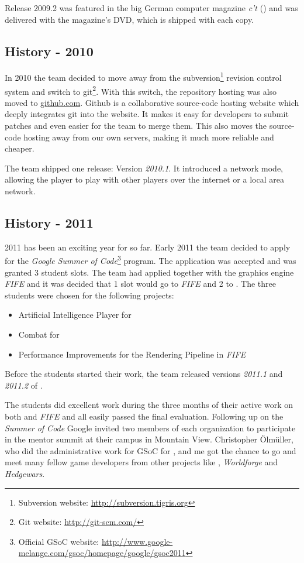 Release 2009.2 was featured in the big German computer magazine \textit{c't} (\cite{ct}) and was delivered with the magazine's
DVD, which is shipped with each copy.

\subsection{History - 2010}
In 2010 the team decided to move away from the subversion\footnote{Subversion website: \url{http://subversion.tigris.org}} revision control
system and switch to git\footnote{Git website: \url{http://git-scm.com/}}. With this switch, the repository hosting was also moved to
\href{http://www.github.com}{github.com}. Github is a collaborative source-code hosting website which deeply integrates
git into the website. It makes it easy for developers to submit patches and even easier for the team to merge them. This
also moves the source-code hosting away from our own servers, making it much more reliable and cheaper.

The team shipped one release: Version \textit{2010.1}. It introduced a network mode, allowing the player
to play with other players over the internet or a local area network.

\subsection{History - 2011}
2011 has been an exciting year for \UH{} so far. Early 2011 the team decided to apply for the \textit{Google Summer of
Code}\footnote{Official GSoC website: \url{http://www.google-melange.com/gsoc/homepage/google/gsoc2011}} program. The
application was accepted and \UH{} was granted 3 student slots. The team had applied together with the graphics engine
\textit{FIFE} and it was decided that 1 slot would go to \textit{FIFE} and 2 to \UH{}. The three students were chosen
for the following projects:
\begin{itemize}
    \item Artificial Intelligence Player for \UH{}
    \item Combat for \UH{}
    \item Performance Improvements for the Rendering Pipeline in \textit{FIFE}
\end{itemize}
Before the students started their work, the team released versions \textit{2011.1} and \textit{2011.2} of \UH{}.

The students did excellent work during the three months of their active work on both \UH{} and \textit{FIFE} and all
easily passed the final evaluation. Following up on the \textit{Summer of Code} Google invited two members of each
organization to participate in the mentor summit at their campus in Mountain View. Christopher Ölmüller, who did the
administrative work for GSoC for \UH{}, and me got the chance to go and meet many fellow \OS{} game developers
from other projects like \BOW{}, \textit{Worldforge} and \textit{Hedgewars}.

